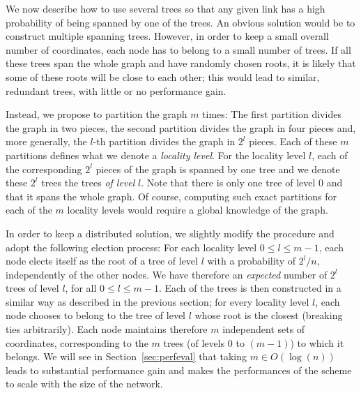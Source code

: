 \documentclass[conference]{IEEEtran}
\begin{document}
We now describe how to use several trees so that any given link has a high probability of being spanned by one of the trees. 
An obvious solution would be to construct multiple spanning trees. However, in order to keep a small overall number of coordinates, each node has to belong to a small number of trees. If all these trees span the whole graph and have randomly chosen roots, it is likely that some of these roots will be close to each other; this would lead to similar, redundant trees, with little or no performance gain.

Instead, we propose to partition the graph $m$ times: 
The first partition divides the graph in two pieces, the second partition divides the graph in four pieces and, more generally, the $l$-th partition divides the graph in $2^l$ pieces. Each of these $m$ partitions defines what we denote a \emph{locality level}.
For the locality level $l$, each of the corresponding $2^l$ pieces of the graph is spanned by one tree and we denote these $2^l$ trees the trees \emph{of level} $l$.
Note that there is only one tree of level $0$ and that it spans the whole graph.
Of course, computing such exact partitions for each of the $m$ locality levels would require a global knowledge of the graph.


In order to keep a distributed solution, we slightly modify the procedure and adopt the following election process: For each locality level $0 \leq l \leq m-1$, each node elects itself as the root of a tree of level $l$ with a probability of $2^l/n$, independently of the other nodes. We have therefore an \emph{expected} number of $2^l$ trees of level $l$, for all $0\leq l \leq m-1$. Each of the trees is then constructed in a similar way as described in the previous section; for every locality level $l$, each node chooses to belong to the tree of level $l$ whose root is the closest (breaking ties arbitrarily). Each node maintains therefore $m$ independent sets of coordinates, corresponding to the $m$ trees (of levels $0$ to $(m-1)$) to which it belongs. We will see in Section~\ref{sec:perfeval} that taking $m \in O(\log(n))$ leads to substantial performance gain and makes the performances of the scheme to scale with the size of the network.
\end{document}
